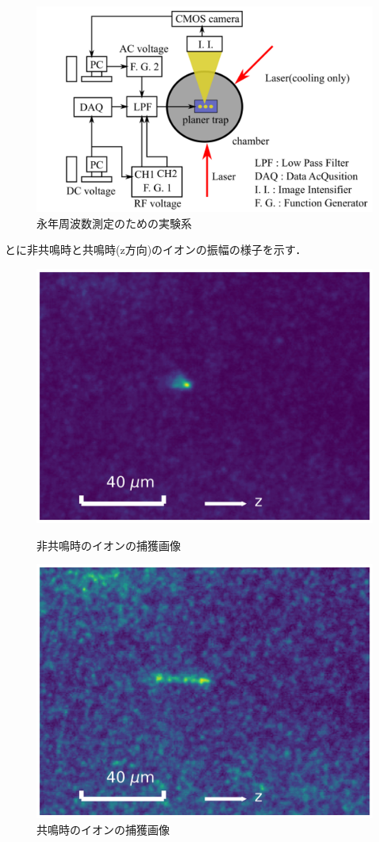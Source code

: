 \begin{figure}[h]
	\centering
	\includegraphics[width = 0.6\linewidth]{./methods/figure/SecularFreqMeasSetup.png}
	\caption{永年周波数測定のための実験系}
	\label{fig:MeasSec_System}
\end{figure}

とに非共鳴時と共鳴時(z方向)のイオンの振幅の様子を示す．

\begin{figure}[h]
		\begin{minipage}{0.48\linewidth}
			\centering
			\includegraphics[width = 0.6\columnwidth]{./methods/figure/off_resonance.jpg}
			\caption{非共鳴時のイオンの捕獲画像}
			\label{fig:example_off_resonance}
		\end{minipage}
		\begin{minipage}{0.48\linewidth}
			\centering
			\includegraphics[width = 0.6\columnwidth]{./methods/figure/resonance.jpg}
			\caption{共鳴時のイオンの捕獲画像}
			\label{fig:example_resonance}
		\end{minipage}
\end{figure}

